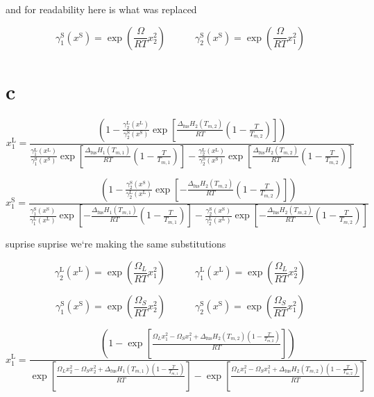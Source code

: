 \documentclass{article}
\begin{document}
and for readability here is what was replaced

\[ \gamma_1^{\text{S}}(x^{\text{S}}) = \exp \left( \frac{\Omega}{RT} x_2^2 \right) \hspace{3em} \gamma_2^{\text{S}}(x^{\text{S}}) = \exp \left( \frac{\Omega}{RT} x_1^2 \right) \]


\section{c}
\Large

\[
x_1^{\text{L}} =
\frac{
\left(1 - \frac{\gamma_2^{\text{L}}(x^{\text{L}})}{\gamma_2^{\text{S}}(x^{\text{S}})} 
\exp\left[ \frac{\Delta_{\text{fus}} H_2 (T_{m,2})}{RT} \left( 1 - \frac{T}{T_{m,2}} \right) \right] \right)
}
{
\frac{\gamma_1^{\text{L}}(x^{\text{L}})}{\gamma_1^{\text{S}}(x^{\text{S}})} 
\exp\left[ \frac{\Delta_{\text{fus}} H_1 (T_{m,1})}{RT} \left( 1 - \frac{T}{T_{m,1}} \right) \right]
- \frac{\gamma_2^{\text{L}}(x^{\text{L}})}{\gamma_2^{\text{S}}(x^{\text{S}})} 
\exp\left[ \frac{\Delta_{\text{fus}} H_2 (T_{m,2})}{RT} \left( 1 - \frac{T}{T_{m,2}} \right) \right]
}
\]

\[
x_1^{\text{S}} =
\frac{
\left(1 - \frac{\gamma_2^{\text{S}}(x^{\text{S}})}{\gamma_2^{\text{L}}(x^{\text{L}})} 
\exp\left[ -\frac{\Delta_{\text{fus}} H_2 (T_{m,2})}{RT} \left( 1 - \frac{T}{T_{m,2}} \right) \right] \right)
}
{
\frac{\gamma_1^{\text{S}}(x^{\text{S}})}{\gamma_1^{\text{L}}(x^{\text{L}})} 
\exp\left[ -\frac{\Delta_{\text{fus}} H_1 (T_{m,1})}{RT} \left( 1 - \frac{T}{T_{m,1}} \right) \right]
- \frac{\gamma_2^{\text{S}}(x^{\text{S}})}{\gamma_2^{\text{L}}(x^{\text{L}})} 
\exp\left[ -\frac{\Delta_{\text{fus}} H_2 (T_{m,2})}{RT} \left( 1 - \frac{T}{T_{m,2}} \right) \right]
}
\]

suprise suprise we`re making the same substitutions

\[
\gamma_2^{\text{L}}(x^{\text{L}}) = \exp \left( \frac{\Omega_L}{RT} x_1^2 \right) \hspace{3em} \gamma_1^{\text{L}}(x^{\text{L}}) = \exp \left( \frac{\Omega_L}{RT} x_2^2 \right)
\]

\[ \gamma_1^{\text{S}}(x^{\text{S}}) = \exp \left( \frac{\Omega_S}{RT} x_2^2 \right) \hspace{3em} \gamma_2^{\text{S}}(x^{\text{S}}) = \exp \left( \frac{\Omega_S}{RT} x_1^2 \right) \]


\[
x_1^{\text{L}} =
\frac{
\left(1 - 
\exp\left[ 
\frac{\Omega_L x_1^2 - \Omega_S x_1^2 + \Delta_{\text{fus}} H_2 (T_{m,2}) \left( 1 - \frac{T}{T_{m,2}} \right)}{RT}
\right] 
\right)
}
{
\exp\left[ 
\frac{\Omega_L x_2^2 - \Omega_S x_2^2 + \Delta_{\text{fus}} H_1 (T_{m,1}) \left( 1 - \frac{T}{T_{m,1}} \right)}{RT}
\right]
- 
\exp\left[ 
\frac{\Omega_L x_1^2 - \Omega_S x_1^2 + \Delta_{\text{fus}} H_2 (T_{m,2}) \left( 1 - \frac{T}{T_{m,2}} \right)}{RT}
\right]
}
\]
\end{document}
